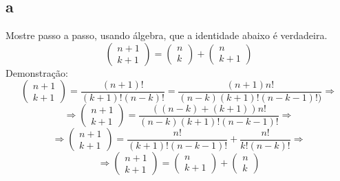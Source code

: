 \documentclass{article}[twocolumn]
\begin{document}
	\subsection{a}
	Mostre passo a passo, usando álgebra, que a identidade abaixo é verdadeira.
	\begin{equation}
		\left(\begin{array}{c}
			n + 1\\k + 1
		\end{array}\right)
		=
		\left(\begin{array}{c}
			n\\k
		\end{array}\right)
		+
		\left(\begin{array}{c}
			n\\k + 1
		\end{array}\right)
	\end{equation}
	Demonstração:
	\begin{equation}
		\left(\begin{array}{c}
			n + 1 \\ k + 1
		\end{array}\right)
		= \frac{(n + 1)!}{(k + 1)!(n - k)!}
		= \frac{(n + 1)n!}{(n - k)(k + 1)!(n - k - 1)!)} \Rightarrow
	\end{equation}
	\begin{equation}
		\Rightarrow
		\left(\begin{array}{c}
			n + 1 \\ k + 1
		\end{array}\right)
		= \frac{((n - k) + (k + 1))n!}{(n - k)(k + 1)!(n - k - 1)!} \Rightarrow
	\end{equation}
	\begin{equation}
		\Rightarrow
		\left(\begin{array}{c}
			n + 1 \\ k + 1
		\end{array}\right)
		= \frac{n!}{(k + 1)!(n - k - 1)!} + \frac{n!}{k!(n - k)!} \Rightarrow
	\end{equation}
	\begin{equation}
		\Rightarrow
		\left(\begin{array}{c}
			n + 1 \\ k + 1
		\end{array}\right)
		=
		\left(\begin{array}{c}
			n\\k + 1
		\end{array}\right)
		+
		\left(\begin{array}{c}
			n\\k
		\end{array}\right)
	\end{equation}
\end{document}
